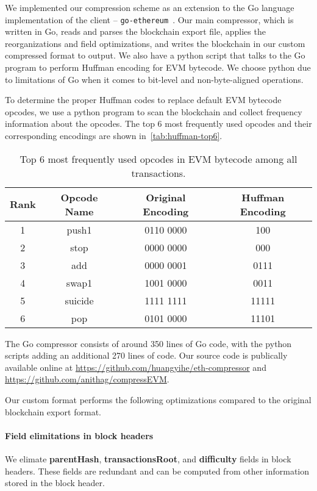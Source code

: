 We implemented our compression scheme as an extension to the Go language implementation of the \eth{} client -- \texttt{go-ethereum}~\cite{go-eth}.
Our main compressor, which is written in Go, reads and parses the blockchain export file,
applies the reorganizations and field optimizations, and writes the blockchain in our custom compressed format to output.
We also have a python script that talks to the Go program to perform Huffman encoding for EVM bytecode.
We choose python due to limitations of Go when it comes to bit-level and non-byte-aligned operations.

To determine the proper Huffman codes to replace default EVM bytecode opcodes, we use a python program to scan the blockchain
and collect frequency information about the opcodes. The top 6 most frequently used opcodes and their corresponding encodings
are shown in~\autoref{tab:huffman-top6}.

\begin{table}[H]
\centering
\begin{tabular}{ c | c | c | c }
	Rank & {Opcode Name} & {Original Encoding} & {Huffman Encoding} \\
\hline
1 & push1   & 0110 0000 & 100\\
2 & stop    & 0000 0000 & 000\\
3 & add     & 0000 0001 & 0111\\
4 & swap1   & 1001 0000 & 0011\\
5 & suicide & 1111 1111 & 11111\\
6 & pop     & 0101 0000 & 11101\\
\end{tabular}
\caption{Top 6 most frequently used opcodes in EVM bytecode among all transactions.}
\label{tab:huffman-top6}
\end{table}

The Go compressor consists of around 350 lines of Go code,
with the python scripts adding an additional 270 lines of code.
Our source code is publically available online at
\url{https://github.com/huangyihe/eth-compressor}
and
\url{https://github.com/anithag/compressEVM}.

Our custom format performs the following optimizations compared to the original blockchain export format.

\paragraph{Field elimitations in block headers} We elimate \textbf{parentHash}, \textbf{transactionsRoot},
and \textbf{difficulty} fields in block headers. These fields are redundant and can be computed from
other information stored in the block header.

